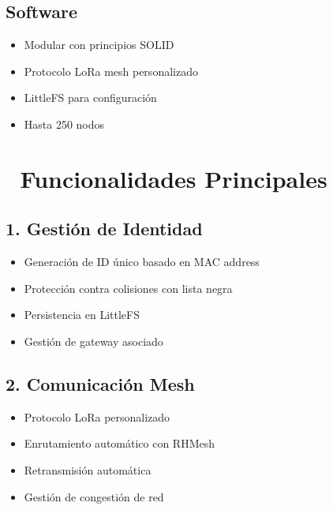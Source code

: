 \documentclass[a4paper,11pt,spanish]{sphinxmanual}
\begin{document}
\section{Software}
\label{\detokenize{index:software}}\begin{itemize}
\item {} 
\sphinxAtStartPar
{} Modular con principios SOLID

\item {} 
\sphinxAtStartPar
{} Protocolo LoRa mesh personalizado

\item {} 
\sphinxAtStartPar
{} LittleFS para configuración

\item {} 
\sphinxAtStartPar
{} Hasta 250 nodos

\end{itemize}


\chapter{🚀 Funcionalidades Principales}
\label{\detokenize{index:funcionalidades-principales}}

\section{1. Gestión de Identidad}
\label{\detokenize{index:gestion-de-identidad}}\begin{itemize}
\item {} 
\sphinxAtStartPar
Generación de ID único basado en MAC address

\item {} 
\sphinxAtStartPar
Protección contra colisiones con lista negra

\item {} 
\sphinxAtStartPar
Persistencia en LittleFS

\item {} 
\sphinxAtStartPar
Gestión de gateway asociado

\end{itemize}


\section{2. Comunicación Mesh}
\label{\detokenize{index:comunicacion-mesh}}\begin{itemize}
\item {} 
\sphinxAtStartPar
Protocolo LoRa personalizado

\item {} 
\sphinxAtStartPar
Enrutamiento automático con RHMesh

\item {} 
\sphinxAtStartPar
Retransmisión automática

\item {} 
\sphinxAtStartPar
Gestión de congestión de red

\end{itemize}
\end{document}
